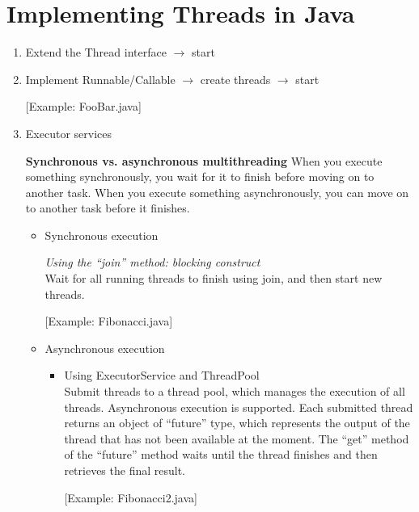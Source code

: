 \documentclass[12pt]{article}
\begin{document}
\maketitle

\section{Implementing Threads in Java}
\begin{enumerate}
\item Extend the Thread interface $\rightarrow$ start

\item Implement Runnable/Callable $\rightarrow$ create threads $\rightarrow$ start

[Example: FooBar.java]

\item Executor services 


\textbf{Synchronous vs. asynchronous multithreading } 
When you execute something synchronously, you wait for it to finish before
moving on to another task. When you execute something asynchronously, you can
move on to another task before it finishes. 

\begin{itemize}
\item Synchronous execution 

\textit{Using the ``join'' method: blocking construct} \\
Wait for all running threads to finish using join, and then start new threads. 

[Example: Fibonacci.java]

\item Asynchronous execution 

\begin{itemize}
\item Using ExecutorService and ThreadPool \\
Submit threads to a thread pool, which manages the execution of all threads.
Asynchronous execution is supported. 
Each submitted thread returns an object of ``future'' type, which represents the output of the
thread that has not been available at the moment. The ``get'' method of the
``future'' method waits until the thread finishes and then retrieves the final
result. 

[Example: Fibonacci2.java] \\


\end{itemize}
\end{itemize}
\end{enumerate}
\end{document}
